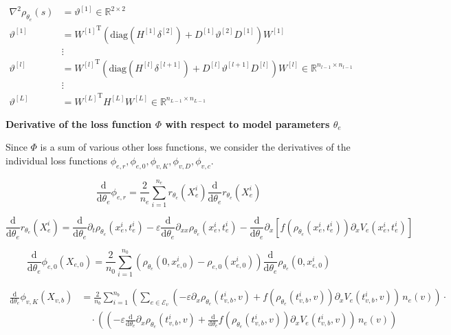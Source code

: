 \begin{align*}
    \nabla^{2} \rho_{\theta_e}(s) & = \vartheta^{[1]} \in \mathbb{R}^{2 \times 2} \\
    \vartheta^{[1]} & = {W^{[1]}}^{\mathrm{T}} \left( \mathrm{diag}(H^{[1]} \delta^{[2]}) + D^{[1]} \vartheta^{[2]} D^{[1]} \right) W^{[1]} \\
    & \vdots \\
    \vartheta^{[l]} & = {W^{[l]}}^{\mathrm{T}} \left( \mathrm{diag}(H^{[l]} \delta^{[l+1]}) + D^{[l]} \vartheta^{[l+1]} D^{[l]} \right) W^{[l]} \in \mathbb{R}^{n_{l-1} \times n_{l-1}} \\
    & \vdots \\
    \vartheta^{[L]} & = {W^{[L]}}^{\mathrm{T}} H^{[L]} W^{[L]} \in \mathbb{R}^{n_{L-1} \times n_{L-1}}
\end{align*}



\textbf{Derivative of the loss function $\Phi$ with respect to model parameters $\theta_e$}

Since $\Phi$ is a sum of various other loss functions, we consider the derivatives of the individual loss functions $\phi_{e,r}, \phi_{e,0}, \phi_{v,K}, \phi_{v,D}, \phi_{v,c}$. 

\begin{equation*}
    \frac{\mathrm{d}}{\mathrm{d} \theta_e} \phi_{e,r} = \frac{2}{n_e} \sum_{i=1}^{n_e} r_{\theta_e} (X_e^i) \frac{\mathrm{d}}{\mathrm{d} \theta_e} r_{\theta_e} (X_e^i) 
\end{equation*}

\begin{equation*}
    \frac{\mathrm{d}}{\mathrm{d} \theta_e} r_{\theta_e} (X_e^i) =  \frac{\mathrm{d}}{\mathrm{d} \theta_e} \partial_t \rho_{\theta_{e}} (x_{e}^i , t_{e}^i) - \varepsilon \frac{\mathrm{d}}{\mathrm{d} \theta_e} \partial_{xx} \rho_{\theta_e}(x_e^i, t_e^i) - \frac{\mathrm{d}}{\mathrm{d} \theta_e} \partial_x [f(\rho_{\theta_e}(x_e^i, t_e^i)) \partial_x V_e(x_e^i, t_e^i)] 
\end{equation*}

\begin{equation*}
    \frac{\mathrm{d}}{\mathrm{d} \theta_e} \phi_{e,0} (X_{e,0}) = \frac{2}{n_0} \sum_{i=1}^{n_0} (\rho_{\theta_e} (0,x_{e,0}^i) - \rho_{e,0}(x_{e,0}^i)) \frac{\mathrm{d}}{\mathrm{d} \theta_e} \rho_{\theta_e} (0,x_{e,0}^i)
\end{equation*}

\begin{align*}
    \frac{\mathrm{d}}{\mathrm{d} \theta_e} \phi_{v,K} (X_{v,b}) & = \frac{2}{n_b} \sum_{i=1}^{n_b} (\sum_{e \in \mathcal{E}_v} (- \varepsilon \partial_x \rho_{\theta_e} (t_{v,b}^i, v) + f(\rho_{\theta_e} (t_{v,b}^i, v)) \partial_x V_e(t_{v,b}^i, v)) \, n_e (v)) \cdot \\ 
    & \quad \cdot ((- \varepsilon \frac{\mathrm{d}}{\mathrm{d} \theta_e} \partial_x \rho_{\theta_e} (t_{v,b}^i, v) + \frac{\mathrm{d}}{\mathrm{d} \theta_e} f(\rho_{\theta_e} (t_{v,b}^i, v)) \partial_x V_e(t_{v,b}^i, v)) \, n_e (v))
\end{align*}

